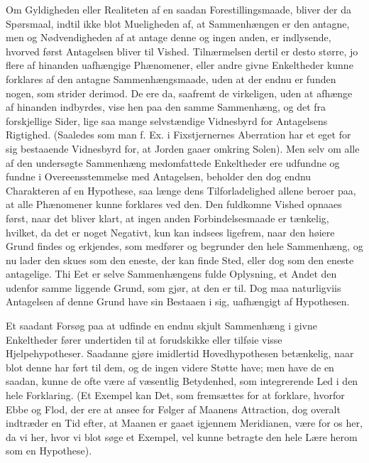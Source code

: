 \documentclass[12pt]{book}
\def\textit#1{#1}%
\def\emph#1{#1}%
\newcommand{\opage}[1]{\marginnote{\footnotesize\textit{[#1]}}}
\begin{document}
Om Gyldigheden eller Realiteten af en saadan Forestillingsmaade, bliver der da
Spørsmaal, indtil ikke blot Mueligheden af, at Sammenhængen er den antagne, men
og Nødvendigheden af at antage denne og ingen anden, er
\opage{65} indlysende, hvorved først Antagelsen bliver til Vished. Tilnærmelsen dertil er
desto større, jo flere af hinanden uafhængige Phænomener, eller andre givne
Enkeltheder kunne forklares af den antagne Sammenhængsmaade, uden at der endnu
er funden nogen, som strider derimod. De ere da, saafremt de virkeligen, uden
at afhænge af hinanden indbyrdes, vise hen paa den samme Sammenhæng, og det fra
forskjellige Sider, lige saa mange selvstændige Vidnesbyrd for Antagelsens
Rigtighed. (Saaledes som man f. Ex. i Fixstjernernes Aberration har et eget for
sig bestaaende Vidnesbyrd for, at Jorden gaaer omkring Solen). Men selv om alle
af den undersøgte Sammenhæng medomfattede Enkeltheder ere udfundne og fundne i
Overeensstemmelse med Antagelsen, beholder den dog endnu Charakteren af en
Hypothese, saa længe dens Tilforladelighed allene beroer paa, at alle
Phænomener kunne forklares ved den. Den fuldkomne Vished opnaaes først, naar
det bliver klart, at ingen anden Forbindelsesmaade er tænkelig, hvilket, da det
er noget Negativt, kun kan indsees ligefrem, naar den høiere Grund findes og
erkjendes, som medfører og begrunder den hele Sammenhæng, og nu lader den skues
som den eneste, der kan finde Sted, eller dog som den eneste antagelige. Thi
Eet er selve Sammenhængens fulde Oplysning, et Andet den udenfor samme liggende
Grund, som gjør, at den er til. Dog maa naturligviis Antagelsen af denne Grund
\opage{66} have sin Bestaaen i sig, uafhængigt af Hypothesen.

Et saadant Forsøg paa at udfinde en endnu skjult Sammenhæng i givne
Enkeltheder fører undertiden til at forudskikke eller tilføie visse
\emph{Hjelpehypotheser}. Saadanne gjøre imidlertid Hovedhypothesen betænkelig,
naar blot denne har ført til dem, og de ingen videre Støtte have; men have de
en saadan, kunne de ofte være af væsentlig Betydenhed, som integrerende Led i
den hele Forklaring. (Et Exempel kan Det, som fremsættes for at forklare,
hvorfor Ebbe og Flod, der ere at ansee for Følger af Maanens Attraction, dog
overalt indtræder en Tid efter, at Maanen er gaaet igjennem Meridianen, være
for os her, da vi her, hvor vi blot søge et Exempel, vel kunne betragte den
hele Lære herom som en Hypothese).
\end{document}
